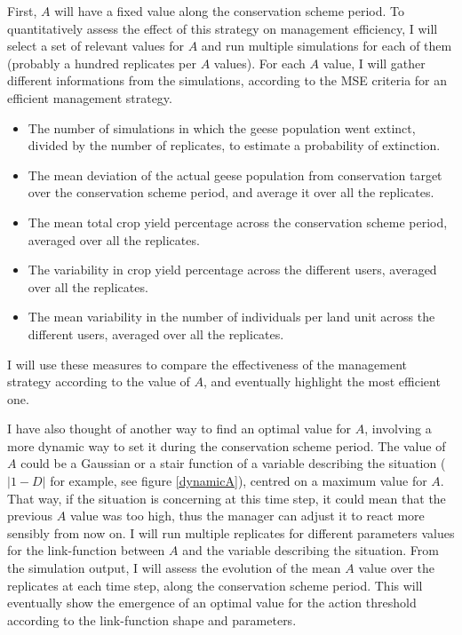 \documentclass[12pt,a4paper]{article}
\begin{document}
First, $A$ will have a fixed value along the conservation scheme period.
To quantitatively assess the effect of this strategy on management efficiency, I will select a set of relevant values for $A$ and run multiple simulations for each of them (probably a hundred replicates per $A$ values).
For each $A$ value, I will gather different informations from the simulations, according to the MSE criteria for an efficient management strategy.
\begin{itemize}
	\item The number of simulations in which the geese population went extinct, divided by the number of replicates, to estimate a probability of extinction.
	\item The mean deviation of the actual geese population from conservation target over the conservation scheme period, and average it over all the replicates.
	\item The mean total crop yield percentage across the conservation scheme period, averaged over all the replicates.
	\item The variability in crop yield percentage across the different users, averaged over all the replicates.
	\item The mean variability in the number of individuals per land unit across the different users, averaged over all the replicates.
\end{itemize}
I will use these measures to compare the effectiveness of the management strategy according to the value of $A$, and eventually highlight the most efficient one.

I have also thought of another way to find an optimal value for $A$, involving a more dynamic way to set it during the conservation scheme period.
The value of $A$ could be a Gaussian or a stair function of a variable describing the situation ($|1-D|$ for example, see figure \ref{dynamicA}), centred on a maximum value for $A$.
That way, if the situation is concerning at this time step, it could mean that the previous $A$ value was too high, thus the manager can adjust it to react more sensibly from now on.
I will run multiple replicates for different parameters values for the link-function between $A$ and the variable describing the situation.
From the simulation output, I will assess the evolution of the mean $A$ value over the replicates at each time step, along the conservation scheme period.
This will eventually show the emergence of an optimal value for the action threshold according to the link-function shape and parameters.
\end{document}
